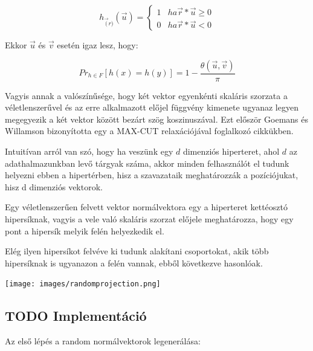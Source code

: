 \documentclass[final, 12pt] {ubb_dolgozat}{book}
\begin{document}
\begin{equation}
h_{\overrightarrow(r)} (\overrightarrow{u})= \begin{cases}
                                                1 & ha \overrightarrow{r} * \overrightarrow{u} \ge 0 \\
                                                0 & ha \overrightarrow{r} * \overrightarrow{u} < 0
                                                \end{cases}
\end{equation}


Ekkor \(\overrightarrow{u}\) és \(\overrightarrow{v}\) esetén igaz lesz, hogy:


\begin{equation}
Pr_{h \in F} [h(x) = h(y)] = 1 - \frac{\theta(\overrightarrow{ u }, \overrightarrow{ v })}{\pi}
\end{equation}
\citep{charikarSimilarityEstimationTechniques}

Vagyis annak a valószínűsége, hogy két vektor egyenkénti skaláris szorzata a véletlenszerűvel és az erre alkalmazott előjel függvény kimenete ugyanaz legyen megegyezik a két vektor között
bezárt szög koszinuszával.
Ezt először Goemans és Willamson bizonyította \citep{goemansImprovedApproximationAlgorithms1995} egy a MAX-CUT relaxációjával foglalkozó cikkükben.

Intuitívan arról van szó, hogy ha veszünk egy \(d\)  dimenziós hiperteret, ahol \(d\) az adathalmazunkban levő tárgyak száma, akkor minden felhasználót el tudunk helyezni ebben a
hipertérben, hisz a szavazataik meghatározzák a pozíciójukat, hisz d dimenziós vektorok.

Egy véletlenszerűen felvett vektor normálvektora egy a hiperteret kettéosztó hipersíknak, vagyis
a vele való skaláris szorzat előjele meghatározza, hogy egy pont a hipersík melyik felén helyezkedik el.

Elég ilyen hipersíkot felvéve ki tudunk alakítani csoportokat, akik több hipersíknak is ugyanazon
a felén vannak, ebből következve hasonlóak.


\begin{center}
\texttt{[image: images/randomprojection.png]}
\end{center}
\citep{RandomProjectionLocality}

\subsection{{\bfseries\sffamily TODO} Implementáció}
\label{sec:orgdcc24b6}
Az első lépés a random normálvektorok legenerálása:
\end{document}
